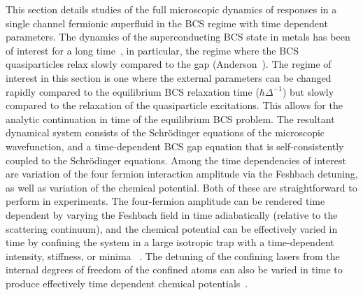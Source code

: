 \documentclass[aps,pra,floats,epsfig,pdflatex]{revtex4}                                                              %
\begin{document}
 {This section details studies of the full microscopic dynamics of responses in a single channel fermionic superfluid in the BCS regime with time dependent parameters. The dynamics of the superconducting BCS state in metals has been of interest for a long time}~\cite{tinkham},  {in particular, the regime where the BCS quasiparticles relax slowly compared to the gap} (Anderson~\cite{anderson}).  {The regime of interest in this section is one where the external parameters can be changed rapidly compared to the equilibrium BCS relaxation time ($\hbar\Delta^{-1}$) but slowly compared to the relaxation of the quasiparticle excitations. This allows for the analytic continuation in time of the equilibrium BCS problem. The resultant dynamical system consists of the Schr\"odinger equations of the microscopic wavefunction, and a time-dependent BCS gap equation that is self-consistently coupled to the Schr\"odinger equations. Among the time dependencies of interest are variation of the four fermion interaction 
amplitude via the Feshbach detuning, as well as variation of the chemical potential. Both of these are straightforward to perform in experiments. The four-fermion amplitude can be rendered time dependent by varying the Feshbach field in time adiabatically (relative to the scattering continuum), and the chemical potential can be effectively varied in time by confining the system in a large isotropic trap with a time-dependent intensity, stiffness, or minima}~\cite{colrev} {. The detuning of the confining lasers from the internal degrees of freedom of the confined atoms can also be varied in time to produce effectively time dependent chemical potentials}~\cite{fdet}.
\end{document}
